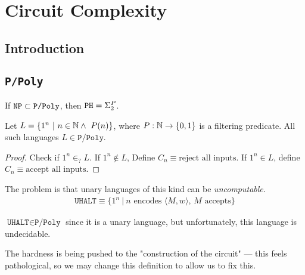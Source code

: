 \newcommand{\ppoly}{\texttt{P/Poly}}
\chapter{Circuit Complexity}

\section{Introduction}
\section{\ppoly}
If $\nptime \subset \ppoly$, then $\texttt{PH} = \Sigma_2^P$.

\begin{theorem}
    Let $L = \{ 1^n ~\vert~ n \in \mathbb{N} \land ~P(n) \}$, where $P: \mathbb{N} \to \{0, 1\}$
    is a filtering predicate. All such languages $L \in \ppoly$.
\end{theorem}
\begin{proof}
    Check if $1^n \in_? L$. If $1^n \notin L$, Define $C_n \equiv \text{reject all inputs}$.
    If $1^n \in L$, define $C_n \equiv \text{accept all inputs}$.
\end{proof}

The problem is that unary languages of this kind can be \textit{uncomputable}.
\begin{align*}
    \texttt{UHALT} \equiv \{ 1^n~\vert~ \text{$n$ encodes $\langle M, w \rangle$, $M$ accepts} \}
\end{align*}

$\texttt{UHALT} \in \ppoly$ since it is a unary language, but unfortunately, this
language is undecidable.

The hardness is being pushed to the "construction of the circuit" --- this
feels pathological, so we may change this definition to allow us to
fix this.

